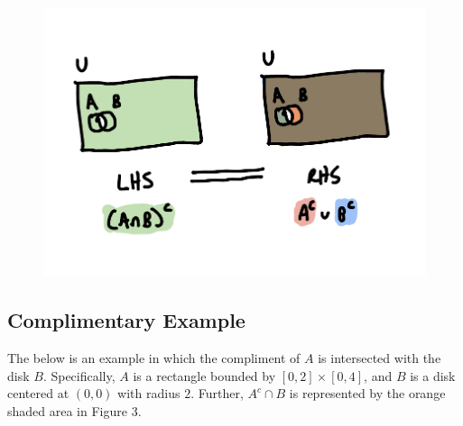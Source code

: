 \documentclass{article}
\begin{document}
\begin{figure}[!htb]
    \centering
    \includegraphics[scale=0.175]{./demorgans-2.jpeg}
    \label{fig:demorgans-2}
\end{figure}

\newpage
\subsection{Complimentary Example}

The below is an example in which the compliment of $A$ is intersected with the disk $B$. Specifically, $A$ is a rectangle bounded by $[0, 2] \times [0, 4]$, and $B$ is a disk centered at $(0, 0)$ with radius $2$. Further, $A^c \cap B$ is represented by the orange shaded area in Figure 3.
\end{document}
